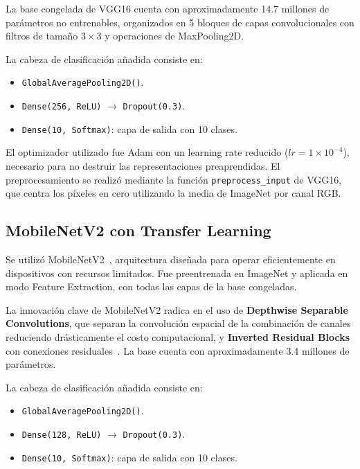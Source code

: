 \documentclass[1p,12pt]{elsarticle}
\begin{document}
La base congelada de VGG16 cuenta con aproximadamente 14.7 millones de
parámetros no entrenables, organizados en 5 bloques de capas convolucionales
con filtros de tamaño $3 \times 3$ y operaciones de MaxPooling2D.

La cabeza de clasificación añadida consiste en:

\begin{itemize}
    \item \texttt{GlobalAveragePooling2D()}.
    \item \texttt{Dense(256,\,ReLU)} $\rightarrow$ \texttt{Dropout(0.3)}.
    \item \texttt{Dense(10,\,Softmax)}: capa de salida con 10 clases.
\end{itemize}

El optimizador utilizado fue Adam con un learning rate reducido
($lr = 1 \times 10^{-4}$), necesario para no destruir las representaciones
preaprendidas. El preprocesamiento se realizó mediante la función
\texttt{preprocess\_input} de VGG16, que centra los píxeles en cero utilizando
la media de ImageNet por canal RGB.

\subsection{MobileNetV2 con Transfer Learning}
\label{sub:mobilenetv2}

Se utilizó MobileNetV2~\cite{Sandler2018}, arquitectura diseñada para operar
eficientemente en dispositivos con recursos limitados. Fue preentrenada en
ImageNet y aplicada en modo Feature Extraction, con todas las capas de la base
congeladas.

La innovación clave de MobileNetV2 radica en el uso de \textbf{Depthwise
Separable Convolutions}, que separan la convolución espacial de la combinación
de canales reduciendo drásticamente el costo computacional, y \textbf{Inverted
Residual Blocks} con conexiones residuales~\cite{He2016}. La base cuenta con
aproximadamente 3.4 millones de parámetros.

La cabeza de clasificación añadida consiste en:

\begin{itemize}
    \item \texttt{GlobalAveragePooling2D()}.
    \item \texttt{Dense(128,\,ReLU)} $\rightarrow$ \texttt{Dropout(0.3)}.
    \item \texttt{Dense(10,\,Softmax)}: capa de salida con 10 clases.
\end{itemize}
\end{document}
